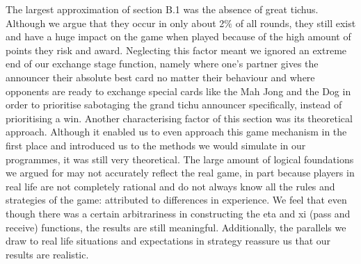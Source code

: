 The largest approximation of section B.1 was the absence of great tichus. Although we argue that they occur in only about 2$\%$ of all rounds, they still exist and have a huge impact on the game when played because of the high amount of points they risk and award. Neglecting this factor meant we ignored an extreme end of our exchange stage function, namely where one’s partner gives the announcer their absolute best card no matter their behaviour and where opponents are ready to exchange special cards like the Mah Jong and the Dog in order to prioritise sabotaging the grand tichu announcer specifically, instead of prioritising a win. Another characterising factor of this section was its theoretical approach. Although it enabled us to even approach this game mechanism in the first place and introduced us to the methods we would simulate in our programmes, it was still very theoretical. The large amount of logical foundations we argued for may not accurately reflect the real game, in part because players in real life are not completely rational and do not always know all the rules and strategies of the game: attributed to differences in experience. We feel that even though there was a certain arbitrariness in constructing the eta and xi (pass and receive) functions, the results are still meaningful. Additionally, the parallels we draw to real life situations and expectations in strategy reassure us that our results are realistic. 


